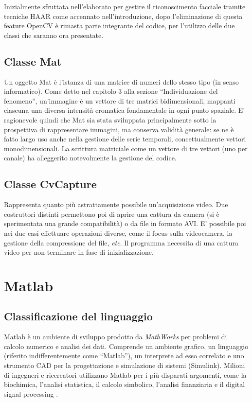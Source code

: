 Inizialmente sfruttata nell'elaborato per gestire il riconoscimento facciale tramite tecniche HAAR come accennato nell'introduzione, dopo l'eliminazione di questa feature OpenCV è rimasta parte integrante del codice, per l'utilizzo delle due classi che saranno ora presentate.
	\subsection{Classe Mat}
Un oggetto Mat è l'istanza di una matrice di numeri dello stesso tipo (in senso informatico).
Come detto nel capitolo 3 alla sezione ``Individuazione del fenomeno'', un'immagine è un vettore di tre matrici bidimensionali, mappanti ciascuna una diversa intensità cromatica fondamentale in ogni punto spaziale. E' ragionevole quindi che Mat sia stata sviluppata principalmente sotto la prospettiva di rappresentare immagini, ma conserva validità generale: se ne è fatto largo uso anche nella gestione delle serie temporali, concettualmente vettori monodimensionali. La scrittura matriciale come un vettore di tre vettori (uno per canale) ha alleggerito notevolmente la gestione del codice.
	\subsection{Classe CvCapture}
Rappresenta quanto più astrattamente possibile un'acquisizione video. Due costruttori distinti permettono poi di aprire una cattura da camera (si è sperimentata una grande compatibilità) o da file in formato AVI. E' possibile poi nei due casi effettuare operazioni diverse, come il focus sulla videocamera, la gestione della compressione del file, {\em etc}. Il programma necessita di una cattura video per non terminare in fase di inizializzazione.
\section{Matlab}
	\subsection{Classificazione del linguaggio}
Matlab è un ambiente di sviluppo prodotto da {\em MathWorks} per problemi di calcolo numerico e analisi dei dati. Comprende un ambiente grafico, un linguaggio (riferito indifferentemente come ``Matlab''), un interprete ad esso correlato e uno strumento CAD per la progettazione e simulazione di sistemi (Simulink).
Milioni di ingegneri e ricercatori utilizzano Matlab per i più disparati argomenti, come la biochimica, l'analisi statistica, il calcolo simbolico, l'analisi finanziaria e il digital signal processing \cite{MATLAB}.

